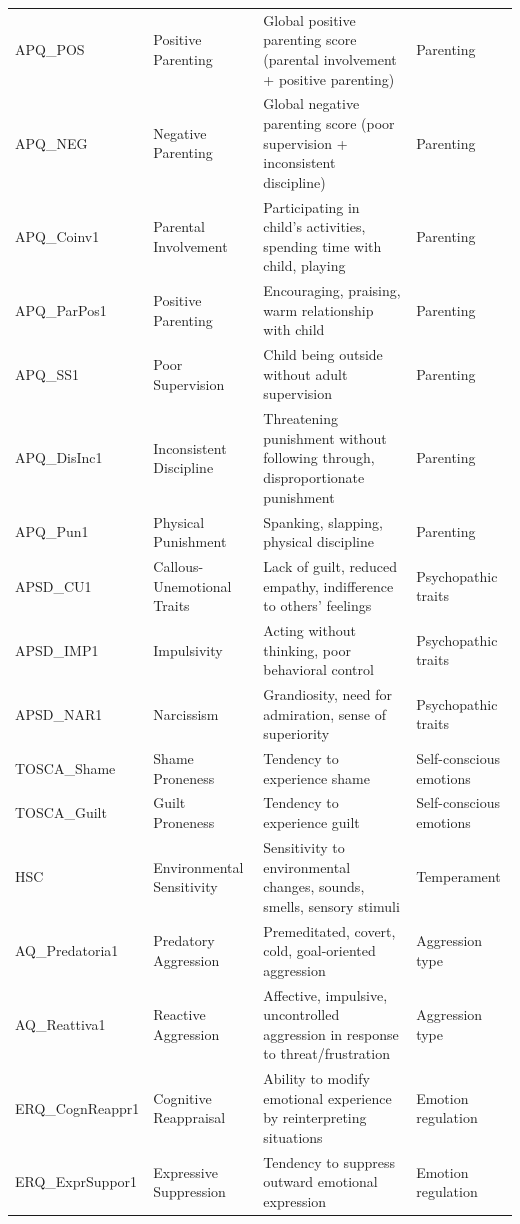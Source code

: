\begin{longtable}{p{2.5cm} p{3cm} p{7cm} p{2.5cm}}
APQ_POS & Positive Parenting & Global positive parenting score (parental involvement + positive parenting) & Parenting \\ 
APQ_NEG & Negative Parenting & Global negative parenting score (poor supervision + inconsistent discipline) & Parenting \\ 
APQ_Coinv1 & Parental Involvement & Participating in child's activities, spending time with child, playing & Parenting \\ 
APQ_ParPos1 & Positive Parenting & Encouraging, praising, warm relationship with child & Parenting \\ 
APQ_SS1 & Poor Supervision & Child being outside without adult supervision & Parenting \\ 
APQ_DisInc1 & Inconsistent Discipline & Threatening punishment without following through, disproportionate punishment & Parenting \\ 
APQ_Pun1 & Physical Punishment & Spanking, slapping, physical discipline & Parenting \\ 
APSD_CU1 & Callous-Unemotional Traits & Lack of guilt, reduced empathy, indifference to others' feelings & Psychopathic traits \\ 
APSD_IMP1 & Impulsivity & Acting without thinking, poor behavioral control & Psychopathic traits \\ 
APSD_NAR1 & Narcissism & Grandiosity, need for admiration, sense of superiority & Psychopathic traits \\ 
TOSCA_Shame & Shame Proneness & Tendency to experience shame & Self-conscious emotions \\ 
TOSCA_Guilt & Guilt Proneness & Tendency to experience guilt & Self-conscious emotions \\ 
HSC & Environmental Sensitivity & Sensitivity to environmental changes, sounds, smells, sensory stimuli & Temperament \\ 
AQ_Predatoria1 & Predatory Aggression & Premeditated, covert, cold, goal-oriented aggression & Aggression type \\ 
AQ_Reattiva1 & Reactive Aggression & Affective, impulsive, uncontrolled aggression in response to threat/frustration & Aggression type \\ 
ERQ_CognReappr1 & Cognitive Reappraisal & Ability to modify emotional experience by reinterpreting situations & Emotion regulation \\ 
ERQ_ExprSuppor1 & Expressive Suppression & Tendency to suppress outward emotional expression & Emotion regulation \\ 

\end{longtable}
